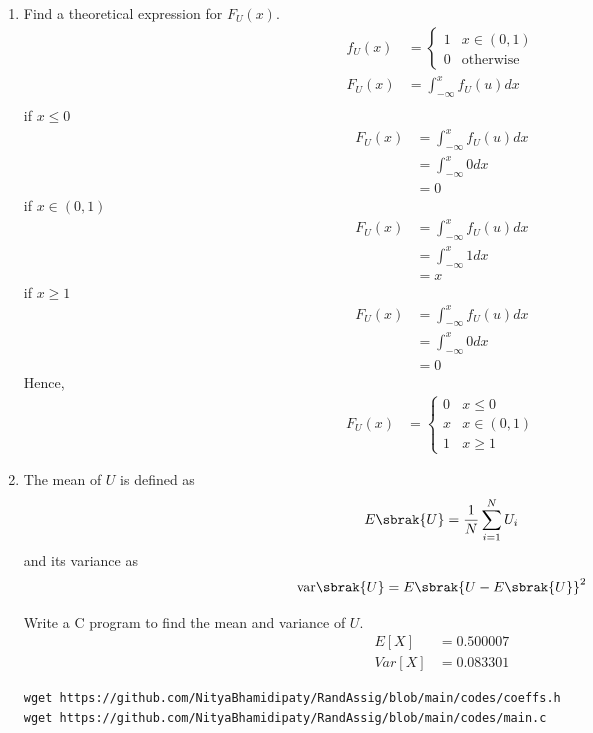 \documentclass[journal,12pt,twocolumn]{IEEEtran}
\renewcommand\thesection{\arabic{section}}
\begin{document}
\begin{enumerate}[label=\thesection.\arabic*
,ref=\thesection.\theenumi]
\item
Find a  theoretical expression for $F_{U}(x)$.
\\
\solution
\begin{align}
    f_U(x) &= \begin{cases}
    1 & x\in(0,1)\\
    0 & \text{otherwise}
    \end{cases}\\
    F_U(x) &= \int_{-\infty}^{x}f_U(u)dx\\
\end{align}
if $x \le 0$
\begin{align}
    F_U(x) &= \int_{-\infty}^{x}f_U(u)dx\\
        &= \int_{-\infty}^{x}0dx\\
        &= 0
\end{align}
if $x \in (0,1)$
\begin{align}
    F_U(x) &= \int_{-\infty}^{x}f_U(u)dx\\
        &= \int_{-\infty}^{x}1dx\\
        &= x
\end{align}
if $x \ge 1$
\begin{align}
    F_U(x) &= \int_{-\infty}^{x}f_U(u)dx\\
        &= \int_{-\infty}^{x}0dx\\
        &= 0
\end{align}
Hence,
\begin{align}
    F_U(x) &= \begin{cases}
     0 & x\le0\\
     x & x\in(0,1)\\
     1 & x\ge1
    \end{cases}
\end{align}
\item
The mean of $U$ is defined as
%
\begin{equation}
E\sbrak{U} = \frac{1}{N}\sum_{i=1}^{N}U_i
\end{equation}
%
and its variance as
%
\begin{equation}
\text{var}\sbrak{U} = E\sbrak{U- E\sbrak{U}}^2 
\end{equation}

Write a C program to  find the mean and variance of $U$. 
\\
\solution
\begin{align}
    E[X] &= 0.500007\\
    Var[X] &= 0.083301
\end{align}
\begin{lstlisting}
wget https://github.com/NityaBhamidipaty/RandAssig/blob/main/codes/coeffs.h  
wget https://github.com/NityaBhamidipaty/RandAssig/blob/main/codes/main.c
\end{lstlisting}


\end{enumerate}
\end{document}
